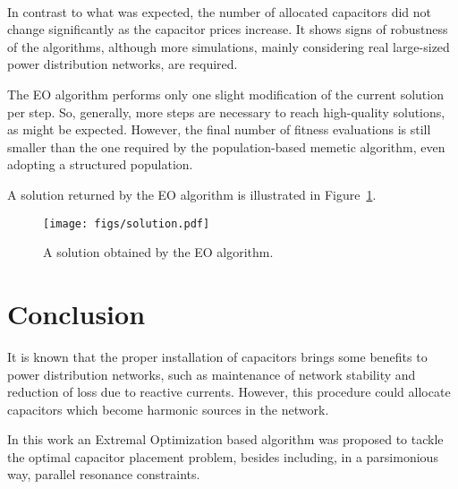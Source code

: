 \documentclass[11pt]{article}
\begin{document}
\begin{figure*}[htb]
  \centering
  ~ 

  \caption{Quantity of each type of capacitors allocated by the algorithms varying the capacitors cost.}
  \label{fig:type_caps_allocated_varcaps}
\end{figure*}

In contrast to what was expected, the number of allocated capacitors did not change significantly as the capacitor
prices increase. It shows signs of robustness of the algorithms, although more simulations, mainly considering real 
large-sized power distribution networks, are required.

The EO algorithm performs only one slight modification of the current solution per step. So, generally, 
more steps are necessary to reach high-quality solutions, as might be expected. However,
the final number of fitness evaluations is still smaller than the one required by the population-based memetic algorithm, even
adopting a structured population.

A solution returned by the EO algorithm is illustrated in Figure~\ref{fig:solucao}. 

\begin{figure}[!ht]
	\centering
	\texttt{[image: figs/solution.pdf]}
	\caption{A solution obtained by the EO algorithm.}
	\label{fig:solucao}
\end{figure}

\section{Conclusion}
\label{sec:conclusao}

It is known that the proper installation of capacitors brings some benefits 
to power distribution networks, such as maintenance of network stability
and reduction of loss due to reactive currents. However, this procedure 
could allocate capacitors which become harmonic sources in the network. 

In this work an Extremal Optimization based algorithm was proposed to tackle 
the optimal capacitor placement problem, besides including, in a parsimonious way,
parallel resonance constraints. 
\end{document}
